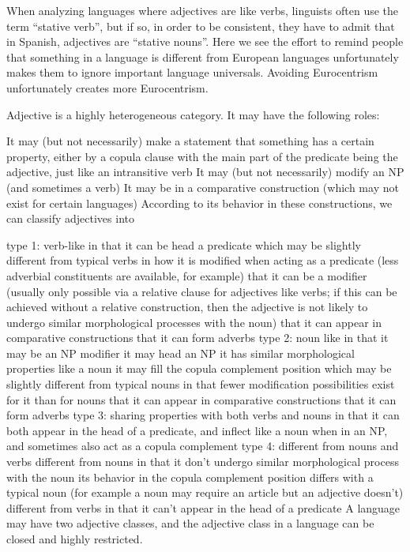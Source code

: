 \documentclass[UTF8, a4paper, oneside, scheme=plain]{ctexart}
\begin{document}
When analyzing languages where adjectives are like verbs, 
linguists often use the term ``stative verb'', 
but if so, in order to be consistent, they have to admit that in Spanish, 
adjectives are ``stative nouns''. 
Here we see the effort to remind people that something in a language is different from European languages
unfortunately makes them to ignore important language universals.
Avoiding Eurocentrism unfortunately creates more Eurocentrism.

Adjective is a highly heterogeneous category. It may have the following roles:

It may (but not necessarily) make a statement that something has a certain property, either
by a copula clause
with the main part of the predicate being the adjective, just like an intransitive verb
It may (but not necessarily) modify an NP (and sometimes a verb)
It may be in a comparative construction (which may not exist for certain languages)
According to its behavior in these constructions, we can classify adjectives into

type 1: verb-like
in that it can be head a predicate
which may be slightly different from typical verbs in
how it is modified when acting as a predicate (less adverbial constituents are available, for example)
that it can be a modifier (usually only possible via a relative clause for adjectives like verbs; if this can be achieved without a relative construction, then the adjective is not likely to undergo similar morphological processes with the noun)
that it can appear in comparative constructions
that it can form adverbs
type 2: noun like
in that
it may be an NP modifier
it may head an NP
it has similar morphological properties like a noun
it may fill the copula complement position
which may be slightly different from typical nouns in
that fewer modification possibilities exist for it than for nouns
that it can appear in comparative constructions
that it can form adverbs
type 3: sharing properties with both verbs and nouns
in that it can both
appear in the head of a predicate, and
inflect like a noun when in an NP, and
sometimes also act as a copula complement
type 4: different from nouns and verbs
different from nouns in that
it don't undergo similar morphological process with the noun
its behavior in the copula complement position differs with a typical noun (for example a noun may require an article but an adjective doesn't)
different from verbs in that
it can't appear in the head of a predicate
A language may have two adjective classes, and the adjective class in a language can be closed and highly restricted.
\end{document}
